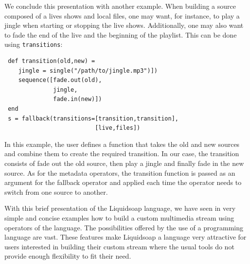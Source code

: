 \documentclass{llncs}
\newcommand{\liquidsoap}{Liquidsoap}
\begin{document}
We conclude this presentation with another example. When building a source composed
of a lives shows and local files, one may want, for instance, to play a jingle when starting
or stopping the live shows. Additionally, one may also want to fade the 
end of the live and the beginning of the playlist. This can be done using \texttt{transitions}:
\begin{verbatim}
 def transition(old,new) = 
    jingle = single("/path/to/jingle.mp3")])
    sequence([fade.out(old), 
              jingle, 
              fade.in(new)])
 end
 s = fallback(transitions=[transition,transition], 
                          [live,files])
\end{verbatim}
In this example, the user defines a function that takes the old and new sources and combine them
to create the required transition. In our case, the transition consists of fade out the old 
source, then play a jingle and finally fade in the new source. As for the metadata operators,
the transition function is passed as an argument for the fallback operator and applied 
each time the operator needs to switch from one source to another.

With this brief presentation of the \liquidsoap{} language, we have seen in very simple and 
concise examples how to build a custom multimedia stream using operators of the language. 
The possibilities offered by the use of a programming 
language are vast. These features make \liquidsoap{} a language very attractive for users
interested in building their custom stream where the usual tools do not provide 
enough flexibility to fit their need.




\end{document}
